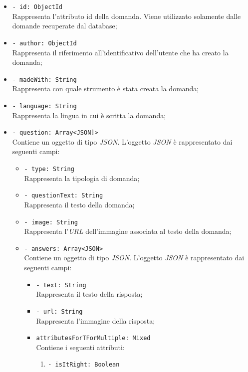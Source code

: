 \begin{itemize}
			\begin{itemize}
				\item \texttt{- id: ObjectId}\\
				Rappresenta l'attributo id della domanda. Viene utilizzato solamente dalle domande recuperate dal database;
				\item \texttt{- author: ObjectId}\\
				Rappresenta il riferimento all'identificativo dell'utente che ha creato la domanda;
				\item \texttt{- madeWith: String}\\ 
				Rappresenta con quale strumento è stata creata la domanda;
				\item \texttt{- language: String}\\
				Rappresenta la lingua in cui è scritta la domanda; 
				\item \texttt{- question: Array<JSON]>}\\ 
				Contiene un oggetto di tipo \textit{JSON}. L'oggetto \textit{JSON} è rappresentato dai seguenti campi:
				\begin{itemize}
					\item \texttt{- type: String}\\
					Rappresenta la tipologia di domanda;
					\item \texttt{- questionText: String}\\ 
					Rappresenta il testo della domanda; 
					\item \texttt{- image: String}\\
					Rappresenta l'\textit{URL} dell'immagine associata al testo della domanda; 
					\item \texttt{- answers: Array<JSON>}\\ 
					Contiene un oggetto di tipo \textit{JSON}. L'oggetto \textit{JSON} è rappresentato dai seguenti campi:
					\begin{itemize}	 				  
						\item \texttt{- text: String}\\
						Rappresenta il testo della risposta;
						\item \texttt{- url: String}\\
						Rappresenta l'immagine della risposta;
						\item \texttt{attributesForTForMultiple: Mixed}\\
						Contiene i seguenti attributi:
						\begin{enumerate}
							\item \texttt{- isItRight: Boolean}\\

\end{enumerate}
\end{itemize}
\end{itemize}
\end{itemize}
\end{itemize}

